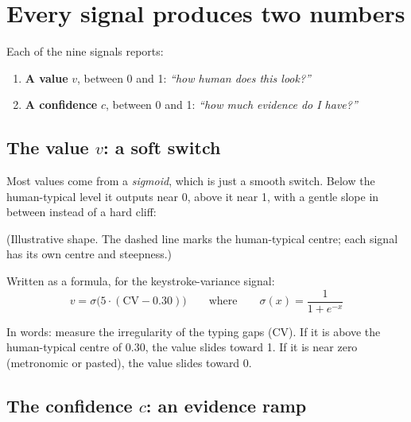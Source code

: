 \documentclass[11pt,a4paper]{article}
\begin{document}
\section{Every signal produces two numbers}

Each of the nine signals reports:

\begin{enumerate}
  \item \textbf{A value} $v$, between 0 and 1: \emph{``how human does this look?''}
  \item \textbf{A confidence} $c$, between 0 and 1: \emph{``how much evidence do I have?''}
\end{enumerate}

\subsection*{The value $v$: a soft switch}

Most values come from a \emph{sigmoid}, which is just a smooth switch. Below the human-typical level it outputs near 0, above it near 1, with a gentle slope in between instead of a hard cliff:

\begin{center}

\small (Illustrative shape. The dashed line marks the human-typical centre; each signal has its own centre and steepness.)
\end{center}

Written as a formula, for the keystroke-variance signal:
\[
v = \sigma\!\big(5 \cdot (\mathrm{CV} - 0.30)\big)
\qquad\text{where}\qquad
\sigma(x) = \frac{1}{1 + e^{-x}}
\]

In words: measure the irregularity of the typing gaps (CV). If it is above the human-typical centre of $0.30$, the value slides toward 1. If it is near zero (metronomic or pasted), the value slides toward 0.

\subsection*{The confidence $c$: an evidence ramp}
\end{document}
